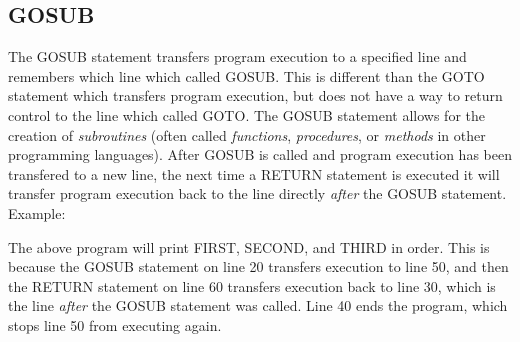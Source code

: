 

\subsection{GOSUB}

The {\ttfamily GOSUB} statement transfers program execution to a specified line
and remembers which line which called {\ttfamily GOSUB}.  This is different
than the {\ttfamily GOTO} statement which transfers program execution, but does
not have a way to return control to the line which called {\ttfamily GOTO}.
The {\ttfamily GOSUB} statement allows for the creation of {\em subroutines}
(often called {\em functions}, {\em procedures}, or {\em methods} in other
programming languages).  After {\ttfamily GOSUB} is called and program
execution has been transfered to a new line, the next time a {\ttfamily RETURN}
statement is executed it will transfer program execution back to the line
directly {\em after} the {\ttfamily GOSUB} statement.\\

Example:\\


The above program will print {\ttfamily FIRST}, {\ttfamily SECOND}, and
{\ttfamily THIRD} in order.  This is because the {\ttfamily GOSUB} statement on
line 20 transfers execution to line 50, and then the {\ttfamily RETURN}
statement on line 60 transfers execution back to line 30, which is the
line {\em after} the {\ttfamily GOSUB} statement was called.  Line 40 ends the 
program, which stops line 50 from executing again.\\


